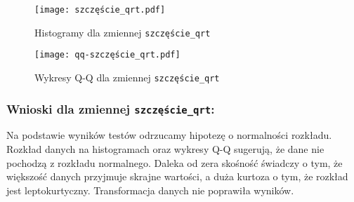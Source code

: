 \documentclass[12pt,a4paper]{article}
\begin{document}
\begin{figure}[H]
    \centering
    \texttt{[image: szczęście\_qrt.pdf]}
    \caption{Histogramy dla zmiennej \texttt{szczęście\_qrt}}
\end{figure}
\begin{figure}[H]
    \centering
    \texttt{[image: qq-szczęście\_qrt.pdf]}
    \caption{Wykresy Q-Q dla zmiennej \texttt{szczęście\_qrt}}
\end{figure}
\subsubsection*{Wnioski dla zmiennej \texttt{szczęście\_qrt}:}
Na podstawie wyników testów odrzucamy hipotezę o normalności rozkładu. Rozkład danych na histogramach oraz wykresy Q-Q sugerują, że dane nie pochodzą z rozkładu normalnego. Daleka od zera skośność świadczy o tym, że większość danych przyjmuje skrajne wartości, a duża kurtoza o tym, że rozkład jest leptokurtyczny. Transformacja danych nie poprawiła wyników.
\end{document}
